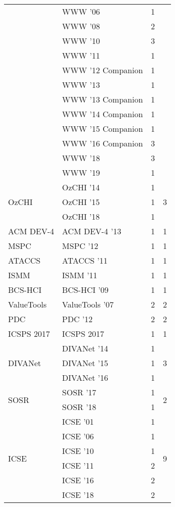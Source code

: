 \begin{table*}[t]
\begin{tabular}{llrr}
& WWW '06 & 1 &\\
& WWW '08 & 2 &\\
& WWW '10 & 3 &\\
& WWW '11 & 1 &\\
& WWW '12 Companion & 1 &\\
& WWW '13 & 1 &\\
& WWW '13 Companion & 1 &\\
& WWW '14 Companion & 1 &\\
& WWW '15 Companion & 1 &\\
& WWW '16 Companion & 3 &\\
& WWW '18 & 3 &\\
& WWW '19 & 1 &\\
\multirow{3}{*}{OzCHI } & OzCHI '14 & 1 & \multirow{3}{*}{3}\\
& OzCHI '15 & 1 &\\
& OzCHI '18 & 1 &\\
\multirow{1}{*}{ACM DEV-4 } & ACM DEV-4 '13 & 1 & \multirow{1}{*}{1}\\
\multirow{1}{*}{MSPC } & MSPC '12 & 1 & \multirow{1}{*}{1}\\
\multirow{1}{*}{ATACCS } & ATACCS '11 & 1 & \multirow{1}{*}{1}\\
\multirow{1}{*}{ISMM } & ISMM '11 & 1 & \multirow{1}{*}{1}\\
\multirow{1}{*}{BCS-HCI } & BCS-HCI '09 & 1 & \multirow{1}{*}{1}\\
\multirow{1}{*}{ValueTools } & ValueTools '07 & 2 & \multirow{1}{*}{2}\\
\multirow{1}{*}{PDC } & PDC '12 & 2 & \multirow{1}{*}{2}\\
\multirow{1}{*}{ICSPS 2017} & ICSPS 2017 & 1 & \multirow{1}{*}{1}\\
\multirow{3}{*}{DIVANet } & DIVANet '14 & 1 & \multirow{3}{*}{3}\\
& DIVANet '15 & 1 &\\
& DIVANet '16 & 1 &\\
\multirow{2}{*}{SOSR } & SOSR '17 & 1 & \multirow{2}{*}{2}\\
& SOSR '18 & 1 &\\
\multirow{6}{*}{ICSE } & ICSE '01 & 1 & \multirow{6}{*}{9}\\
& ICSE '06 & 1 &\\
& ICSE '10 & 1 &\\
& ICSE '11 & 2 &\\
& ICSE '16 & 2 &\\
& ICSE '18 & 2 &\\

\end{tabular}
\end{table*}
